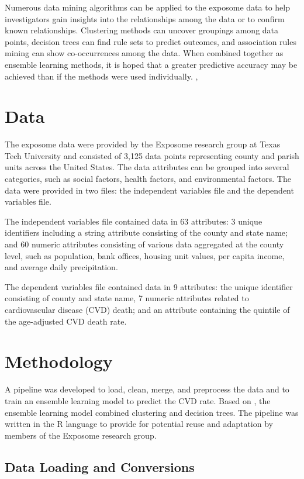 \documentclass[conference,compsoc]{IEEEtran}
\begin{document}
Numerous data mining algorithms can be applied to the exposome data to help investigators gain insights into the relationships among the data or to confirm known
relationships. Clustering methods can uncover groupings among data points, decision trees can find rule sets to predict outcomes, and association rules mining can
show co-occurrences among the data. When combined together as ensemble learning methods, it is hoped that a greater predictive accuracy may be achieved than
if the methods were used individually. \cite{bramer}, \cite{aggarwal}

\section{Data}

The exposome data were provided by the Exposome research group at Texas Tech University 
and consisted of 3,125 data points representing county and parish units across the United States. 
The data attributes can be grouped into several categories, such as social factors, health factors, and environmental factors.
The data were provided in two files: the independent variables file and the dependent variables file.

The independent variables file contained data in 63 attributes: 3 unique identifiers including a string attribute consisting of the county and state name;
and 60 numeric attributes consisting of various data aggregated at the county level, such as population, bank offices, housing unit values, per capita income,
and average daily precipitation.

The dependent variables file contained data in 9 attributes: the unique identifier consisting of county and state name, 7 numeric attributes related to cardiovascular
disease (CVD) death; and an attribute containing the quintile of the age-adjusted CVD death rate.

\section{Methodology}

A pipeline was developed to load, clean, merge, and preprocess the data and to train an ensemble learning model to predict the
CVD rate. Based on \cite{datta}, the ensemble learning model combined clustering and decision trees. The pipeline was written
in the R language to provide for potential reuse and adaptation by members of the Exposome research group.

\subsection{Data Loading and Conversions}
\end{document}
